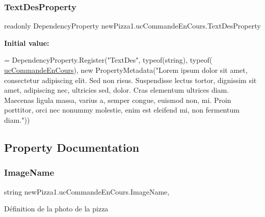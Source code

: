 \subsubsection{\texorpdfstring{Text\+Des\+Property}{TextDesProperty}}
{\footnotesize\ttfamily readonly Dependency\+Property new\+Pizza1.\+uc\+Commande\+En\+Cours.\+Text\+Des\+Property\hspace{0.3cm}{\ttfamily [static]}}

{\bfseries Initial value\+:}
\begin{DoxyCode}
=
            DependencyProperty.Register(\textcolor{stringliteral}{"TextDes"}, typeof(\textcolor{keywordtype}{string}), typeof(
      \hyperlink{classnewPizza1_1_1ucCommandeEnCours_a4076cbc30b75ea9e7894c9688668f616}{ucCommandeEnCours}), \textcolor{keyword}{new} PropertyMetadata(\textcolor{stringliteral}{"Lorem ipsum dolor sit amet, consectetur
       adipiscing elit. Sed non risus. Suspendisse lectus tortor, dignissim sit amet, adipiscing nec, ultricies sed, dolor.
       Cras elementum ultrices diam. Maecenas ligula massa, varius a, semper congue, euismod non, mi. Proin
       porttitor, orci nec nonummy molestie, enim est eleifend mi, non fermentum diam."}))
\end{DoxyCode}


\subsection{Property Documentation}
\mbox{\label{classnewPizza1_1_1ucCommandeEnCours_ab40bde64de41c64202ce6a60224a839f}} 
\subsubsection{\texorpdfstring{Image\+Name}{ImageName}}
{\footnotesize\ttfamily string new\+Pizza1.\+uc\+Commande\+En\+Cours.\+Image\+Name\hspace{0.3cm}{\ttfamily [get]}, {\ttfamily [set]}}



Définition de la photo de la pizza 

\mbox{\label{classnewPizza1_1_1ucCommandeEnCours_a50419dda293e2a59908e57f503d1c5e7}} 

